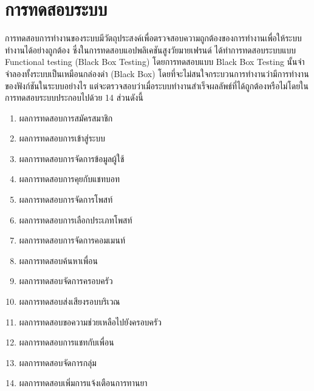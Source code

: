 \chapter{การทดสอบระบบ}

การทดสอบการทำงานของระบบมีวัตถุประสงค์เพื่อตรวจสอบความถูกต้องของการทำงานเพื่อให้ระบบทำงานได้อย่างถูกต้อง ซึ่งในการทดสอบแอปพลิเคชันสูงวัยมายเฟรนด์ ได้ทำการทดสอบระบบแบบ Functional testing (Black Box Testing) โดยการทดสอบแบบ Black Box Testing นั้นจำจำลองทั้งระบบเป็นเหมือนกล่องดำ (Black Box)  โดยที่จะไม่สนใจกระบวนการทำงานว่ามีการทำงานของฟังก์ชันในระบบอย่างไร แต่จะตรวจสอบว่าเมื่อระบบทำงานสำเร็จผลลัพธ์ที่ได้ถูกต้องหรือไม่โดยในการทดสอบระบบประกอบไปด้วย 14 ส่วนดังนี้
\begin{enumerate}[label=5.\arabic*)]
	\item ผลการทดสอบการสมัครสมาชิก
	\item ผลการทดสอบการเข้าสู่ระบบ
	\item ผลการทดสอบการจัดการข้อมูลผู้ใช้
	\item ผลการทดสอบการคุยกับแชทบอท
	\item ผลการทดสอบการจัดการโพสท์
	\item ผลการทดสอบการเลือกประเภทโพสท์
	\item ผลการทดสอบการจัดการคอมเมนท์
	\item ผลการทดสอบค้นหาเพื่อน
	\item ผลการทดสอบจัดการครอบครัว
	\item ผลการทดสอบส่งเสียงรอบบริเวณ
	\item ผลการทดสอบขอความช่วยเหลือไปยังครอบครัว
	\item ผลการทดสอบการแชทกับเพื่อน
	\item ผลการทดสอบจัดการกลุ่ม
	\item ผลการทดสอบเพิ่มการแจ้งเตือนการทานยา
\end{enumerate}

